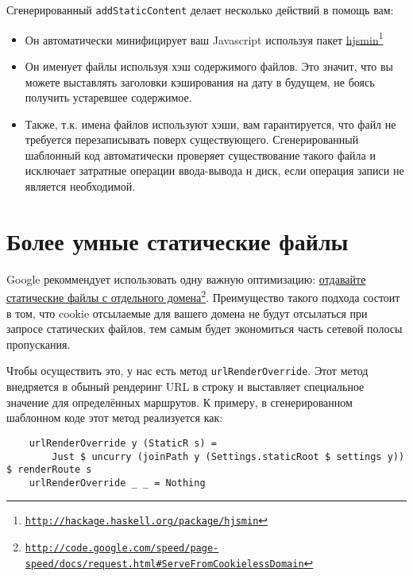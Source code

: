 Сгенерированный \lstinline!addStaticContent! делает несколько действий в помощь вам:
\begin{itemize}
  \item Он автоматически минифицирует ваш Javascript используя пакет \href{http://hackage.haskell.org/package/hjsmin}{hjsmin}\footnote{\href{http://hackage.haskell.org/package/hjsmin}{\texttt{http://hackage.haskell.org/package/hjsmin}}}
  \item Он именует файлы используя хэш содержимого файлов. Это значит, что вы можете выставлять заголовки кэширования на дату в будущем, не боясь получить устаревшее содержимое.
  \item Также, т.к. имена файлов используют хэши, вам гарантируется, что файл не требуется перезаписывать поверх существующего. Сгенерированный шаблонный код автоматически проверяет существование такого файла и исключает затратные операции ввода-вывода н диск, если операция записи не является необходимой.
\end{itemize}

\section {Более умные статические файлы}

Google рекоммендует использовать одну важную оптимизацию: \href{http://code.google.com/speed/page-speed/docs/request.html\#ServeFromCookielessDomain}{отдавайте статические файлы с отдельного домена}\footnote{\href{http://code.google.com/speed/page-speed/docs/request.html\#ServeFromCookielessDomain}{\texttt{http://code.google.com/speed/page-speed/docs/request.html\#ServeFromCookielessDomain}}}. Преимущество такого подхода состоит в том, что cookie отсылаемые для вашего домена не будут отсылаться при запросе статических файлов, тем самым будет экономиться часть сетевой полосы пропускания.

Чтобы осуществить это, у нас есть метод \lstinline!urlRenderOverride!. Этот метод внедряется в обыный рендеринг URL в строку и выставляет специальное значение для определённых маршрутов. К примеру, в сгенерированном шаблонном коде этот метод реализуется как:

\begin{lstlisting}
    urlRenderOverride y (StaticR s) =
        Just $ uncurry (joinPath y (Settings.staticRoot $ settings y)) $ renderRoute s
    urlRenderOverride _ _ = Nothing
\end{lstlisting}%

